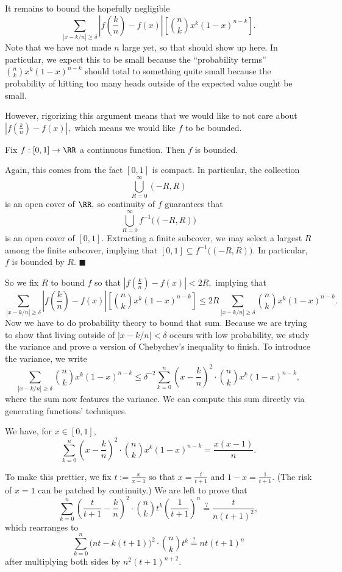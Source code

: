 It remains to bound the hopefully negligible
\[\sum_{|x-k/n|\ge\delta}\left|f\left(\textstyle\frac kn\right)-f(x)\right|\left[\binom nkx^k(1-x)^{n-k}\right].\]
Note that we have not made $n$ large yet, so that should show up here. In particular, we expect this to be small because the ``probability terms'' $\binom nkx^k(1-x)^{n-k}$ should total to something quite small because the probability of hitting too many heads outside of the expected value ought be small.

However, rigorizing this argument means that we would like to not care about $\left|f\left(\frac kn\right)-f(x)\right|,$ which means we would like $f$ to be bounded.
\begin{lemma}
    Fix $f:[0,1]\to\RR$ a continuous function. Then $f$ is bounded.
\end{lemma}
Again, this comes from the fact $[0,1]$ is compact. In particular, the collection
\[\bigcup_{R=0}^\infty(-R,R)\]
is an open cover of $\RR,$ so continuity of $f$ guarantees that
\[\bigcup_{R=0}^\infty f^{-1}\big((-R,R)\big)\]
is an open cover of $[0,1].$ Extracting a finite subcover, we may select a largest $R$ among the finite subcover, implying that $[0,1]\subseteq f^{-1}\big((-R,R)\big).$ In particular, $f$ is bounded by $R.$ $\blacksquare$

So we fix $R$ to bound $f$ so that $\left|f\left(\frac kn\right)-f(x)\right|<2R,$ implying that
\[\sum_{|x-k/n|\ge\delta}\left|f\left(\textstyle\frac kn\right)-f(x)\right|\left[\binom nkx^k(1-x)^{n-k}\right]\le2R\sum_{|x-k/n|\ge\delta}\binom nkx^k(1-x)^{n-k}.\]
Now we have to do probability theory to bound that sum. Because we are trying to show that living outside of $|x-k/n|<\delta$ occurs with low probability, we study the variance and prove a version of Chebychev's inequality to finish. To introduce the variance, we write
\[\sum_{|x-k/n|\ge\delta}\binom nkx^k(1-x)^{n-k}\le\delta^{-2}\sum_{k=0}^n\left(x-\frac kn\right)^2\cdot\binom nkx^k(1-x)^{n-k},\]
where the sum now features the variance. We can compute this sum directly via generating functions' techniques.
\begin{lemma}
    We have, for $x\in[0,1],$
    \[\sum_{k=0}^n\left(x-\frac kn\right)^2\cdot\binom nkx^k(1-x)^{n-k}=\frac{x(x-1)}n.\]
\end{lemma}
To make this prettier, we fix $t:=\frac x{x-1}$ so that $x=\frac t{t+1}$ and $1-x=\frac1{t+1}.$ (The risk of $x=1$ can be patched by continuity.) We are left to prove that
\[\sum_{k=0}^n\left(\frac t{t+1}-\frac kn\right)^2\cdot\binom nkt^k\left(\frac1{t+1}\right)^n\stackrel?=\frac t{n(t+1)^2},\]
which rearranges to
\[\sum_{k=0}^n\big(nt-k(t+1)\big)^2\cdot\binom nkt^k\stackrel?=nt(t+1)^n\]
after multiplying both sides by $n^2(t+1)^{n+2}.$


